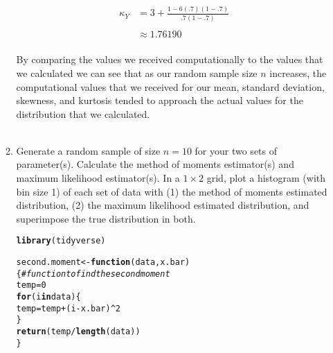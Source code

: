 \documentclass{article}\usepackage[]{graphicx}\usepackage[]{color}
\makeatletter
\newcommand{\hlnum}[1]{\textcolor[rgb]{0.686,0.059,0.569}{#1}}%
\newcommand{\hlcom}[1]{\textcolor[rgb]{0.678,0.584,0.686}{\textit{#1}}}%
\newcommand{\hlopt}[1]{\textcolor[rgb]{0,0,0}{#1}}%
\newcommand{\hlstd}[1]{\textcolor[rgb]{0.345,0.345,0.345}{#1}}%
\newcommand{\hlkwa}[1]{\textcolor[rgb]{0.161,0.373,0.58}{\textbf{#1}}}%
\newcommand{\hlkwb}[1]{\textcolor[rgb]{0.69,0.353,0.396}{#1}}%
\newcommand{\hlkwc}[1]{\textcolor[rgb]{0.333,0.667,0.333}{#1}}%
\newcommand{\hlkwd}[1]{\textcolor[rgb]{0.737,0.353,0.396}{\textbf{#1}}}%
\newenvironment{kframe}{%
 \def\at@end@of@kframe{}%
 \ifinner\ifhmode%
  \def\at@end@of@kframe{\end{minipage}}%
  \begin{minipage}{\columnwidth}%
 \fi\fi%
 \def\FrameCommand##1{\hskip\@totalleftmargin \hskip-\fboxsep
 \colorbox{shadecolor}{##1}\hskip-\fboxsep
     \hskip-\linewidth \hskip-\@totalleftmargin \hskip\columnwidth}%
 \MakeFramed {\advance\hsize-\width
   \@totalleftmargin\z@ \linewidth\hsize
   \@setminipage}}%
 {\par\unskip\endMakeFramed%
 \at@end@of@kframe}
\newenvironment{knitrout}{}{} %
\makeatother
\begin{document}
\begin{enumerate}
\begin{enumerate}
\begin{align*}\kappa_{Y} & =3+\frac{1-6\left(.7\right)\left(1-.7\right)}{.7\left(1-.7\right)}\\
\\
 & \approx1.76190
\end{align*}\\
By comparing the values we received computationally to the values that we calculated we can see that as our random sample size $n$ increases, the computational values that we received for our mean, standard deviation, skewness, and kurtosis tended to approach the actual values for the distribution that we calculated.\\
\\
  \item Generate a random sample of size $n=10$ for your two sets of parameter(s).
  Calculate the method of moments estimator(s) and maximum likelihood estimator(s).
  In a $1 \times 2$ grid, plot a histogram (with bin size 1) of each set of data 
  with (1) the method of moments estimated distribution, (2) the maximum likelihood 
  estimated distribution, and superimpose the true distribution in both.
\begin{knitrout}
\color{fgcolor}\begin{kframe}
\begin{alltt}
\hlkwd{library}\hlstd{(tidyverse)}
\end{alltt}


{\ttfamily\noindent\itshape\color{messagecolor}{\#\# -- Attaching packages --------------------------------------- tidyverse 1.3.1 --}}

{\ttfamily\noindent\itshape\color{messagecolor}{\#\# v ggplot2 3.3.5 \ \ \ \ v purrr \ \ 0.3.4\\\#\# v tibble \ 3.1.4 \ \ \ \ v dplyr \ \ 1.0.7\\\#\# v tidyr \ \ 1.1.3 \ \ \ \ v stringr 1.4.0\\\#\# v readr \ \ 2.0.1 \ \ \ \ v forcats 0.5.1}}

{\ttfamily\noindent\itshape\color{messagecolor}{\#\# -- Conflicts ------------------------------------------ tidyverse\_conflicts() --\\\#\# x dplyr::filter() masks stats::filter()\\\#\# x dplyr::lag() \ \ \ masks stats::lag()}}\begin{alltt}
\hlstd{second.moment} \hlkwb{<-} \hlkwa{function}\hlstd{(}\hlkwc{data}\hlstd{,} \hlkwc{x.bar}\hlstd{)\{}  \hlcom{#function to find the second moment}
  \hlstd{temp} \hlkwb{=} \hlnum{0}
  \hlkwa{for}\hlstd{(i} \hlkwa{in} \hlstd{data)\{}
    \hlstd{temp} \hlkwb{=} \hlstd{temp} \hlopt{+} \hlstd{(i} \hlopt{-} \hlstd{x.bar)}\hlopt{^}\hlnum{2}
  \hlstd{\}}
  \hlkwd{return} \hlstd{(temp}\hlopt{/}\hlkwd{length}\hlstd{(data))}
\hlstd{\}}


\end{alltt}
\end{kframe}
\end{knitrout}
\end{enumerate}
\end{enumerate}
\end{document}
